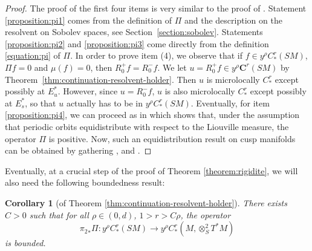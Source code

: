 \documentclass[JEP,XML,SOM,Unicode,NoFloatCountersInSection]{cedram}
\newcommand{\bC}{\boldsymbol{C}}
\theoremstyle{plain}
\newtheorem{corollary}{Corollary}[section]
\theoremstyle{definition}
\begin{document}
\begin{proof}
The proof of the first four items is very similar to the proof of \cite[Th.\,1.1]{Guillarmou-17-1}. Statement \eqref{proposition:pi1} comes from the definition of $\Pi$ and the description on the resolvent on Sobolev spaces, see Section~\ref{section:sobolev}. Statements \eqref{proposition:pi2} and \eqref{proposition:pi3} come directly from the definition \eqref{equation:pi} of $\Pi$. In order to prove item (4), we observe that if $f \in y^\rho C^r_*(SM)$, $\Pi f =0$ and $\mu(f) = 0$, then $R_0^+ f = R_0^- f$. We let $u= R_0^+ f \in y^\rho \bC^r(SM)$ by Theorem~\ref{thm:continuation-resolvent-holder}. Then $u$ is microlocally $C^r_*$ except possibly at $E^\ast_u$. However, since $u=R_0^- f$, $u$ is also microlocally $C^r_*$ except possibly at $E^\ast_s$, so that $u$ actually has to be in $y^\rho C^r_*(SM)$. Eventually, for item \eqref{proposition:pi4}, we can proceed as in \cite[p.\,58--59]{Lefeuvre-these} which shows that, under the assumption that periodic orbits equidistribute with respect to the Liouville measure, the operator $\Pi$ is positive. Now, such an equidistribution result on cusp manifolds can be obtained by gathering \cite[Th.\,7.2, p.\,145]{PPS-15}, \cite[Th.\,1.1]{Riquelme-2018} and \cite[Th.\,9.11]{PPS-15}.
\end{proof}

Eventually, at a crucial step of the proof of Theorem \ref{theorem:rigidite}, we will also need the following boundedness result:

\begin{corollary}[of Theorem \ref{thm:continuation-resolvent-holder}]
\label{corollary:key}
There exists $C \!>\! 0$ such that for all $\rho \!\in\! (0,d)$, $1>r > C\rho$, the operator
\[
{\pi_2}_* \Pi : y^\rho C^r_*(SM) \to y^\rho C^r_*(M,\otimes^2_S T^*M)
\]
is bounded.
\end{corollary}
\end{document}
